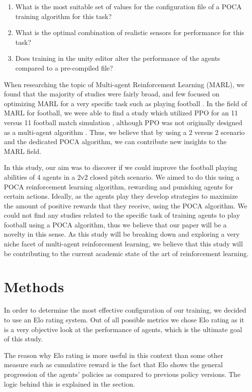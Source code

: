 \documentclass{LSkill}
\begin{document}
\begin{enumerate}
\item What is the most suitable set of values for the configuration file of a POCA training algorithm for this task?
\item What is the optimal combination of realistic sensors for performance for this task?
\item Does training in the unity editor alter the performance of the agents compared to a pre-compiled file?
\end{enumerate}

When researching the topic of Multi-agent Reinforcement Learning (MARL), we found that the majority of studies were fairly broad, and few focused on optimizing MARL for a very specific task such as playing football \cite{Busoniu2008}. In the field of MARL for football, we were able to find a study which utilized PPO for an 11 versus 11 football match simulation \cite{Smit2023}, although PPO was not originally designed as a multi-agent algorithm \cite{Yu2022}. Thus, we believe that by using a 2 versus 2 scenario and the dedicated POCA algorithm, we can contribute new insights to the MARL field.

In this study, our aim was to discover if we could improve the football playing abilities of 4 agents in a 2v2 closed pitch scenario. We aimed to do this using a POCA reinforcement learning algorithm, rewarding and punishing agents for certain actions. Ideally, as the agents play they develop strategies to maximize the amount of positive rewards that they receive, using the POCA algorithm. We could not find any studies related to the specific task of training agents to play football using a POCA algorithm, thus we believe that our paper will be a novelty in this sense. As this study will be breaking down and exploring a very niche facet of multi-agent reinforcement learning, we believe that this study will be contributing to the current academic state of the art of reinforcement learning. 

\section{Methods}
\label{sec:methods}
In order to determine the most effective configuration of our training, we decided to use an Elo rating system. Out of all possible metrics we chose Elo rating as it is a very objective look at the performance of agents, which is the ultimate goal of this study. 

The reason why Elo rating is more useful in this context than some other measure such as cumulative reward is the fact that Elo shows the general progression of the agents’ policies as compared to previous policy versions. The logic behind this is explained in the  section. 
\end{document}
